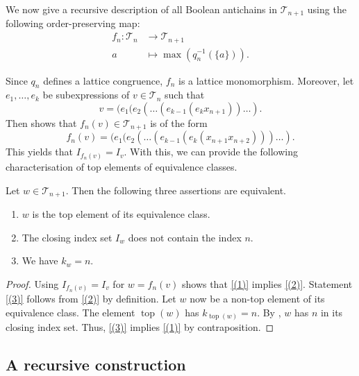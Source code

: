 \documentclass{preprint}
\newcommand{\cT}{\mathcal{T}}
\theoremstyle{definition}
\begin{document}

We now give a recursive description of all Boolean antichains in $\cT_{n+1}$ using the following order-preserving map:
\begin{align*}
    f_n: \cT_n &\rightarrow \cT_{n+1} \\
    a &\mapsto \max(q_n^{-1}(\{a\})).
\end{align*}

Since $q_n$ defines a lattice congruence, $f_n$ is a lattice monomorphism. 
Moreover, let $e_1,\dots,e_k$ be subexpressions of $v \in \cT_n$ such that
$$
    v = (e_1(e_2(\dots(e_{k-1}(e_kx_{n+1}))\dots).
$$
Then  shows that $f_n(v) \in \cT_{n+1}$ is of the form
$$
    f_n(v) = (e_1(e_2(\dots(e_{k-1}(e_k(x_{n+1}x_{n+2})))\dots).
$$
This yields that $I_{f_n(v)} = I_v$. With this, we can provide the following characterisation of top elements of equivalence classes.

\begin{lemma}\label{cor: k_w = n}
    Let $w \in \cT_{n+1}$. Then the following three assertions are equivalent.
    \begin{enumerate}
        \item\label{(1)} $w$ is the top element of its equivalence class.
        \item\label{(2)} The closing index set $I_w$ does not contain the index $n$.
        \item\label{(3)} We have $k_w = n$.
    \end{enumerate}
\end{lemma}
\begin{proof}
    Using $I_{f_n(v)} = I_v$ for $w=f_n(v)$ shows that \eqref{(1)} implies \eqref{(2)}. Statement \eqref{(3)} follows from \eqref{(2)} by definition.
    Let $w$ now be a non-top element of its equivalence class. The element $\operatorname{top}(w)$ has $k_{\operatorname{top}(w)}=n$. By , $w$ has $n$ in its closing index set. Thus, \eqref{(3)} implies \eqref{(1)} by contraposition.
\end{proof}

\subsection{A recursive construction}\label{sec: recursive construction}
\end{document}

